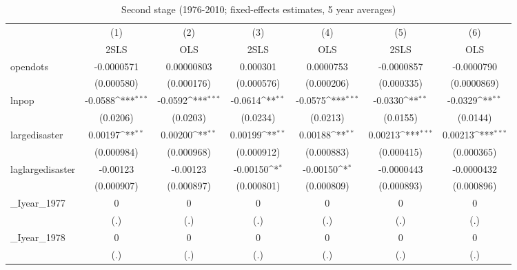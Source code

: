 \begin{table}[htbp]\centering
\def\sym#1{\ifmmode^{#1}\else\(^{#1}\)\fi}
\caption{Second stage (1976-2010; fixed-effects estimates, 5 year averages)}
\begin{tabular}{l*{6}{c}}
\hline\hline
          &\multicolumn{1}{c}{(1)}&\multicolumn{1}{c}{(2)}&\multicolumn{1}{c}{(3)}&\multicolumn{1}{c}{(4)}&\multicolumn{1}{c}{(5)}&\multicolumn{1}{c}{(6)}\\
          &\multicolumn{1}{c}{2SLS}&\multicolumn{1}{c}{OLS}&\multicolumn{1}{c}{2SLS}&\multicolumn{1}{c}{OLS}&\multicolumn{1}{c}{2SLS}&\multicolumn{1}{c}{OLS}\\
\hline
opendots  &-0.0000571         &0.00000803         & 0.000301         &0.0000753         &-0.0000857         &-0.0000790         \\
          &(0.000580)         &(0.000176)         &(0.000576)         &(0.000206)         &(0.000335)         &(0.0000869)         \\
[1em]
lnpop     &  -0.0588\sym{***}&  -0.0592\sym{***}&  -0.0614\sym{**} &  -0.0575\sym{***}&  -0.0330\sym{**} &  -0.0329\sym{**} \\
          & (0.0206)         & (0.0203)         & (0.0234)         & (0.0213)         & (0.0155)         & (0.0144)         \\
[1em]
largedisaster&  0.00197\sym{**} &  0.00200\sym{**} &  0.00199\sym{**} &  0.00188\sym{**} &  0.00213\sym{***}&  0.00213\sym{***}\\
          &(0.000984)         &(0.000968)         &(0.000912)         &(0.000883)         &(0.000415)         &(0.000365)         \\
[1em]
laglargedisaster& -0.00123         & -0.00123         & -0.00150\sym{*}  & -0.00150\sym{*}  &-0.0000443         &-0.0000432         \\
          &(0.000907)         &(0.000897)         &(0.000801)         &(0.000809)         &(0.000893)         &(0.000896)         \\
[1em]
\_Iyear\_1977&        0         &        0         &        0         &        0         &        0         &        0         \\
          &      (.)         &      (.)         &      (.)         &      (.)         &      (.)         &      (.)         \\
[1em]
\_Iyear\_1978&        0         &        0         &        0         &        0         &        0         &        0         \\
          &      (.)         &      (.)         &      (.)         &      (.)         &      (.)         &      (.)         \\

\end{tabular}
\end{table}

